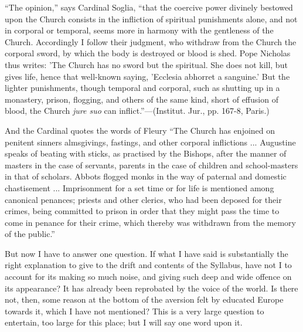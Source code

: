 ``The opinion,'' says Cardinal Soglia, ``that the
coercive power divinely bestowed upon the Church consists in the
infliction of spiritual punishments alone, and not in corporal or
temporal, seems more in harmony with the gentleness of the Church.
Accordingly I follow their judgment, who withdraw from the Church the
corporal sword, by which the body is destroyed or blood is shed. Pope
Nicholas thus writes: 'The Church has no sword but the spiritual. She
does not kill, but gives life, hence that well-known saying, 'Ecclesia
abhorret a sanguine.' But the lighter punishments, though temporal and
corporal, such as shutting up in a monastery, prison, flogging, and
others of the same kind, short of effusion of blood, the Church \emph{jure
suo} can inflict.''—(Institut. Jur., pp. 167-8, Paris.)

And the Cardinal quotes the words of Fleury ``The Church has
enjoined on penitent sinners almsgivings, fastings, and other corporal
inflictions ... Augustine speaks of beating with sticks, as practised by
the Bishops, after the manner of masters in the case of servants,
parents in the case of children and school-masters in that of scholars.
Abbots flogged monks in the way of paternal and domestic chastisement
... Imprisonment for a set time or for life is mentioned among canonical
penances; priests and other clerics, who had been deposed for their
crimes, being committed to prison in order that they might pass the time
to come in penance for their crime, which thereby was withdrawn from the
memory of the public.''

But now I have to answer one question. If what I have said is
substantially the right explanation to give to the drift and contents of
the Syllabus, have not I to account for its making so much noise, and
giving such deep and wide offence on its appearance? It has already been
reprobated by the voice of the world. Is there not, then, some reason at
the bottom of the aversion felt by educated Europe towards it, which I
have not mentioned? This is a very large question to entertain, too
large for this place; but I will say one word upon it.

